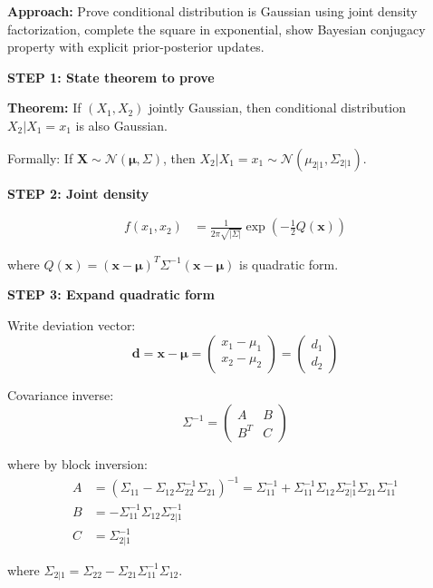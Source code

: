 \documentclass[12pt]{article}
\begin{document}
\begin{solution}

\textbf{Approach:} Prove conditional distribution is Gaussian using joint density factorization, complete the square in exponential, show Bayesian conjugacy property with explicit prior-posterior updates.

\textbf{STEP 1: State theorem to prove}

\textbf{Theorem:} If $(X_1, X_2)$ jointly Gaussian, then conditional distribution $X_2 | X_1 = x_1$ is also Gaussian.

Formally: If $\mathbf{X} \sim \mathcal{N}(\boldsymbol{\mu}, \Sigma)$, then $X_2 | X_1 = x_1 \sim \mathcal{N}(\mu_{2|1}, \Sigma_{2|1})$.

\textbf{STEP 2: Joint density}

\begin{align*}
f(x_1, x_2) &= \frac{1}{2\pi\sqrt{|\Sigma|}}\exp\left(-\frac{1}{2}Q(\mathbf{x})\right)
\end{align*}

where $Q(\mathbf{x}) = (\mathbf{x} - \boldsymbol{\mu})^T\Sigma^{-1}(\mathbf{x} - \boldsymbol{\mu})$ is quadratic form.

\textbf{STEP 3: Expand quadratic form}

Write deviation vector:
\[
\mathbf{d} = \mathbf{x} - \boldsymbol{\mu} = \begin{pmatrix} x_1 - \mu_1 \\ x_2 - \mu_2 \end{pmatrix} = \begin{pmatrix} d_1 \\ d_2 \end{pmatrix}
\]

Covariance inverse:
\[
\Sigma^{-1} = \begin{pmatrix} A & B \\ B^T & C \end{pmatrix}
\]

where by block inversion:
\begin{align*}
A &= (\Sigma_{11} - \Sigma_{12}\Sigma_{22}^{-1}\Sigma_{21})^{-1} = \Sigma_{11}^{-1} + \Sigma_{11}^{-1}\Sigma_{12}\Sigma_{2|1}^{-1}\Sigma_{21}\Sigma_{11}^{-1} \\
B &= -\Sigma_{11}^{-1}\Sigma_{12}\Sigma_{2|1}^{-1} \\
C &= \Sigma_{2|1}^{-1}
\end{align*}

where $\Sigma_{2|1} = \Sigma_{22} - \Sigma_{21}\Sigma_{11}^{-1}\Sigma_{12}$.


\end{solution}
\end{document}
